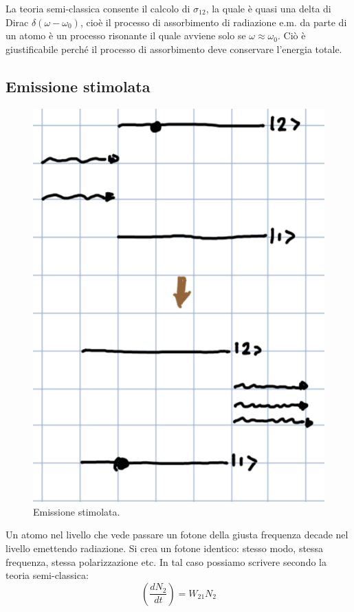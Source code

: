 La teoria semi-classica consente il calcolo di $\sigma_{12}$, la quale è quasi una delta di Dirac $\delta(\omega - \omega_0)$, cioè il processo di assorbimento di radiazione e.m. da parte di un atomo è un processo risonante il quale avviene solo se $\omega \approx \omega_0$. Ciò è giustificabile perché il processo di assorbimento deve conservare l'energia totale.

\subsection{Emissione stimolata}
\begin{figure}
    \centering
    \includegraphics[width=0.9\linewidth]{emiss_stim}
    \caption{Emissione stimolata.}
\end{figure}

Un atomo nel livello  che vede passare un fotone della giusta frequenza decade nel livello  emettendo radiazione. Si crea un fotone identico: stesso modo, stessa frequenza, stessa polarizzazione etc. In tal caso possiamo scrivere secondo la teoria semi-classica:
\begin{equation*}
    \left( \frac{dN_2}{dt} \right) = W_{21} N_2
\end{equation*}

